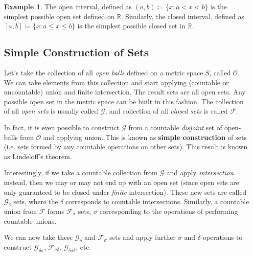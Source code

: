 \documentclass{report}
\theoremstyle{plain}
\theoremstyle{definition}
\newtheorem{example}[theorem]{Example} %
\begin{document}
\begin{example} The open interval, defined as $(a, b)\coloneqq\{x : a < x < b\}$ is the simplest possible open set defined on $\mathbb{R}$. Similarly, the closed interval, defined as $[a, b]\coloneqq\{x : a \leq x \leq b\}$ is the simplest possible closed set in $\mathbb{R}$.
\end{example}
\subsection{Simple Construction of Sets}
Let's take the collection of all \emph{open balls} defined on a metric space $S$, called $\mathcal{O}$. We can take elements from this collection and start applying (countable or uncountable) union and finite intersection. The result sets are all open sets. Any possible open set in the metric space can be built in this fashion. The collection of all \emph{open sets} is usually called $\mathcal{G}$, and collection of all \emph{closed sets} is called $\mathcal{F}$.

In fact, it is even possible to construct $\mathcal{G}$ from a countable \emph{disjoint} set of open-balls from $\mathcal{O}$ and applying union. This is known as \textbf{simple construction} of sets (i.e. sets formed by any countable operations on other sets). This result is known as Lindeloff's theorem.

Interestingly, if we take a countable collection from $\mathcal{G}$ and apply \emph{intersection} instead, then we may or may not end up with an open set (since open sets are only guaranteed to be closed under \emph{finite} intersection). These new sets are called $\mathcal{G}_\delta$ sets, where the $\delta$ corresponds to countable intersections. Similarly, a countable union from $\mathcal{F}$ forms $\mathcal{F}_\sigma$ sets, $\sigma$ corresponding to the operations of performing countable unions.

We can now take these $\mathcal{G}_\delta$ and $\mathcal{F}_\sigma$ sets and apply further $\sigma$ and $\delta$ operations to construct $\mathcal{G}_{\delta\sigma}$, $\mathcal{F}_{\sigma\delta}$, $\mathcal{G}_{\delta\sigma\delta}$, etc.
\end{document}
